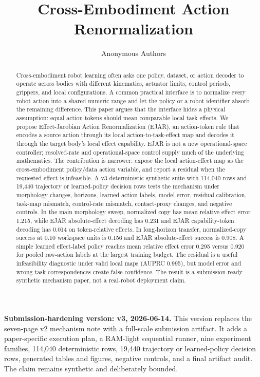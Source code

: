 \documentclass{article}
\title{Cross-Embodiment Action Renormalization}
\author{Anonymous Authors}
\begin{document}
\maketitle

\noindent\textbf{Submission-hardening version: v3, 2026-06-14.}
This version replaces the seven-page v2 mechanism note with a full-scale submission artifact. It adds a paper-specific execution plan, a RAM-light sequential runner, nine experiment families, 114,040 deterministic rows, 19,440 trajectory or learned-policy decision rows, generated tables and figures, negative controls, and a final artifact audit. The claim remains synthetic and deliberately bounded.

\begin{abstract}
Cross-embodiment robot learning often asks one policy, dataset, or action decoder to operate across bodies with different kinematics, actuator limits, control periods, grippers, and local configurations. A common practical interface is to normalize every robot action into a shared numeric range and let the policy or a robot identifier absorb the remaining difference. This paper argues that the interface hides a physical assumption: equal action tokens should mean comparable local task effects. We propose Effect-Jacobian Action Renormalization (EJAR), an action-token rule that encodes a source action through its local action-to-task-effect map and decodes it through the target body's local effect capability. EJAR is not a new operational-space controller; resolved-rate and operational-space control supply much of the underlying mathematics. The contribution is narrower: expose the local action-effect map as the cross-embodiment policy/data action variable, and report a residual when the requested effect is infeasible. A v3 deterministic synthetic suite with 114,040 rows and 19,440 trajectory or learned-policy decision rows tests the mechanism under morphology changes, horizons, learned action labels, model error, residual calibration, task-map mismatch, control-rate mismatch, contact-proxy changes, and negative controls. In the main morphology sweep, normalized copy has mean relative effect error 1.215, while EJAR absolute-effect decoding has 0.231 and EJAR capability-token decoding has 0.014 on token-relative effects. In long-horizon transfer, normalized-copy success at 0.10 workspace units is 0.156 and EJAR absolute-effect success is 0.908. A simple learned effect-label policy reaches mean relative effect error 0.295 versus 0.920 for pooled raw-action labels at the largest training budget. The residual is a useful infeasibility diagnostic under valid local maps (AUPRC 0.995), but model error and wrong task correspondences create false confidence. The result is a submission-ready synthetic mechanism paper, not a real-robot deployment claim.
\end{abstract}
\end{document}
